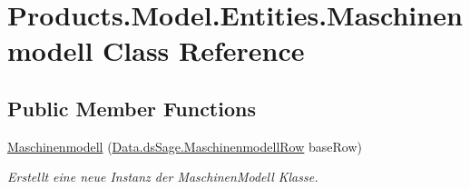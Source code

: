 \hypertarget{class_products_1_1_model_1_1_entities_1_1_maschinenmodell}{}\section{Products.\+Model.\+Entities.\+Maschinenmodell Class Reference}
\label{class_products_1_1_model_1_1_entities_1_1_maschinenmodell}
\subsection*{Public Member Functions}
\begin{DoxyCompactItemize}
\item 
\hyperlink{class_products_1_1_model_1_1_entities_1_1_maschinenmodell_aae8d333aed5c918e768c2942a2947671}{Maschinenmodell} (\hyperlink{class_products_1_1_data_1_1ds_sage_1_1_maschinenmodell_row}{Data.\+ds\+Sage.\+Maschinenmodell\+Row} base\+Row)
\begin{DoxyCompactList}\small\item\em Erstellt eine neue Instanz der Maschinen\+Modell Klasse. \end{DoxyCompactList}\end{DoxyCompactItemize}

